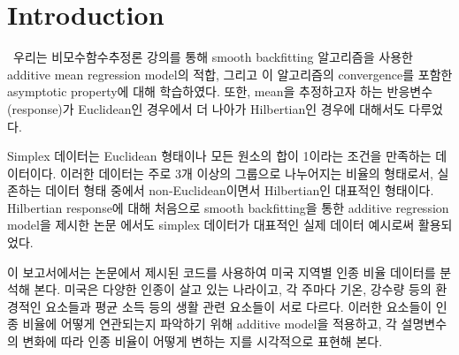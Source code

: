 \section{Introduction}
\label{sec:intro}

\ \quad 우리는 비모수함수추정론 강의를 통해 smooth backfitting 알고리즘을 사용한 additive mean regression model의 적합, 그리고 이 알고리즘의 convergence를 포함한 asymptotic property에 대해 학습하였다. 또한, mean을 추정하고자 하는 반응변수(response)가 Euclidean인 경우에서 더 나아가 Hilbertian인 경우에 대해서도 다루었다.

Simplex 데이터는 Euclidean 형태이나 모든 원소의 합이 1이라는 조건을 만족하는 데이터이다. 이러한 데이터는 주로 3개 이상의 그룹으로 나누어지는 비율의 형태로서, 실존하는 데이터 형태 중에서 non-Euclidean이면서 Hilbertian인 대표적인 형태이다. Hilbertian response에 대해 처음으로 smooth backfitting을 통한 additive regression model을 제시한 논문 \citet{jeon2018additive}에서도 simplex 데이터가 대표적인 실제 데이터 예시로써 활용되었다.

이 보고서에서는 논문에서 제시된 코드를 사용하여 미국 지역별 인종 비율 데이터를 분석해 본다. 미국은 다양한 인종이 살고 있는 나라이고, 각 주마다 기온, 강수량 등의 환경적인 요소들과 평균 소득 등의 생활 관련 요소들이 서로 다르다. 이러한 요소들이 인종 비율에 어떻게 연관되는지 파악하기 위해 additive model을 적용하고, 각 설명변수의 변화에 따라 인종 비율이 어떻게 변하는 지를 시각적으로 표현해 본다.